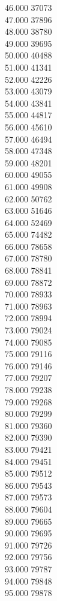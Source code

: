 { 46.000	37073 \\
 47.000	37896 \\
 48.000	38780 \\
 49.000	39695 \\
 50.000	40488 \\
 51.000	41341 \\
 52.000	42226 \\
 53.000	43079 \\
 54.000	43841 \\
 55.000	44817 \\
 56.000	45610 \\
 57.000	46494 \\
 58.000	47348 \\
 59.000	48201 \\
 60.000	49055 \\
 61.000	49908 \\
 62.000	50762 \\
 63.000	51646 \\
 64.000	52469 \\
 65.000	74482 \\
 66.000	78658 \\
 67.000	78780 \\
 68.000	78841 \\
 69.000	78872 \\
 70.000	78933 \\
 71.000	78963 \\
 72.000	78994 \\
 73.000	79024 \\
 74.000	79085 \\
 75.000	79116 \\
 76.000	79146 \\
 77.000	79207 \\
 78.000	79238 \\
 79.000	79268 \\
 80.000	79299 \\
 81.000	79360 \\
 82.000	79390 \\
 83.000	79421 \\
 84.000	79451 \\
 85.000	79512 \\
 86.000	79543 \\
 87.000	79573 \\
 88.000	79604 \\
 89.000	79665 \\
 90.000	79695 \\
 91.000	79726 \\
 92.000	79756 \\
 93.000	79787 \\
 94.000	79848 \\
 95.000	79878 \\
}
